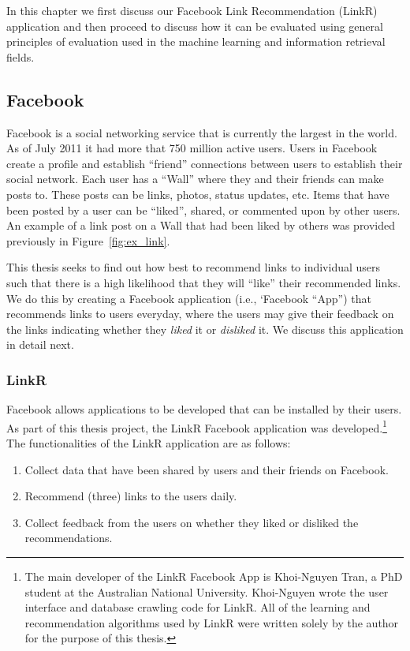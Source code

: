 In this chapter we first discuss our Facebook Link Recommendation
(LinkR) application and then proceed to discuss how it can be
evaluated using general principles of evaluation used in the
machine learning and information retrieval fields.

\subsection{Facebook}

Facebook is a social networking service that is currently the largest
in the world. As of July 2011 it had more that 750 million active
users. Users in Facebook create a profile and establish ``friend''
connections between users to establish their social network. Each user
has a ``Wall'' where they and their friends can make posts to.  These
posts can be links, photos, status updates, etc.  Items that have been
posted by a user can be ``liked'', shared, or commented upon by other
users.  An example of a link post on a Wall that had been liked
by others was provided previously in Figure~\ref{fig:ex_link}.


This thesis seeks to find out how best to recommend links to
individual users such that there is a high likelihood that they will
``like'' their recommended links.  We do this by creating a
Facebook application (i.e., `Facebook ``App'') that recommends links
to users everyday, where the users may give their feedback on the
links indicating whether they \emph{liked} it or \emph{disliked} it.
We discuss this application in detail next.

\subsubsection{LinkR}

Facebook allows applications to be developed that can be installed by
their users.  As part of this thesis project, the LinkR Facebook
application was developed.\footnote{The main developer of the LinkR
Facebook App is Khoi-Nguyen Tran, a PhD student at the Australian
National University.  Khoi-Nguyen wrote the user interface and database
crawling code for LinkR.  All of the learning and recommendation
algorithms used by LinkR were written solely by the author for the
purpose of this thesis.}  The functionalities of the LinkR application
are as follows:
\begin{enumerate}
\item{Collect data that have been shared by users and their friends on Facebook.}
\item{Recommend (three) links to the users daily.}
\item{Collect feedback from the users on whether they liked or disliked the recommendations.}
\end{enumerate}

